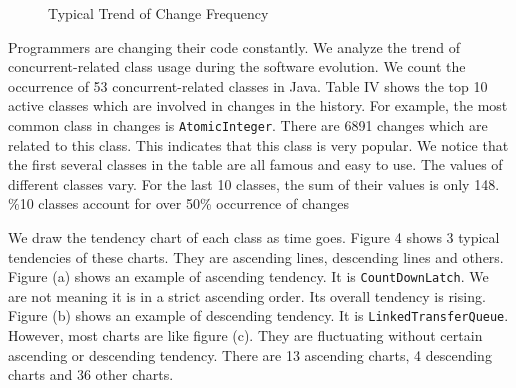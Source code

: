 \begin{figure}
	\centering
	\caption{Typical Trend of Change Frequency}
\end{figure}

Programmers are changing their code constantly. We analyze the trend of concurrent-related class usage during the software evolution. We count the occurrence of 53 concurrent-related classes in Java. Table IV shows the top 10 active classes which are involved in changes in the history. For example, the most common class in changes is \texttt{AtomicInteger}. There are 6891 changes which are related to this class. This indicates that this class is very popular. We notice that the first several classes in the table are all famous and easy to use. The values of different classes vary. For the last 10 classes, the sum of their values is only 148. \%10 classes account for over 50\% occurrence of changes

We draw the tendency chart of each class as time goes. Figure 4 shows 3 typical tendencies of these charts. They are ascending lines, descending lines and others. Figure (a) shows an example of ascending tendency. It is \texttt{CountDownLatch}. We are not meaning it is in a strict ascending order. Its overall tendency is rising. Figure (b) shows an example of descending tendency. It is \texttt{LinkedTransferQueue}. However, most charts are like figure (c). They are fluctuating without certain ascending or descending tendency. There are 13 ascending charts, 4 descending charts and 36 other charts.


